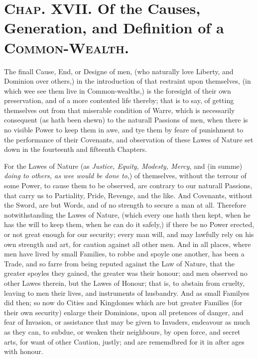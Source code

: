 
\section*{\textsc{Chap}. XVII. Of the Causes, Generation,
and Definition of a \textsc{Common-Wealth}.}

The finall Cause, End, or Designe of men, (who naturally love Liberty,
and Dominion over others,) in the introduction of that restraint upon
themselves, (in which wee see them live in Common-wealths,) is the
foresight of their own preservation, and of a more contented life
thereby; that is to say, of getting themselves out from that miserable
condition of Warre, which is necessarily consequent (as hath been
shewn) to the naturall Passions of men, when there is no visible Power
to keep them in awe, and tye them by feare of punishment to the
performance of their Covenants, and observation of these Lawes of
Nature set down in the fourteenth and fifteenth Chapters.

For the Lawes of Nature (as \textit{Justice, Equity, Modesty, Mercy},
and (in summe) \textit{doing to others, as wee would be done to},) of
themselves, without the terrour of some Power, to cause them to be
observed, are contrary to our naturall Passions, that carry us to
Partiality, Pride, Revenge, and the like. And Covenants, without the
Sword, are but Words, and of no strength to secure a man at all.
Therefore notwithstanding the Lawes of Nature, (which every one hath
then kept, when he has the will to keep them, when he can do it
safely,) if there be no Power erected, or not great enough for our
security; every man will, and may lawfully rely on his own strength
and art, for caution against all other men. And in all places,
 where men have lived by small Families, to robbe and spoyle
one another, has been a Trade, and so farre from being reputed against
the Law of Nature, that the greater spoyles they gained, the greater
was their honour; and men observed no other Lawes therein, but the
Lawes of Honour; that is, to abstain from cruelty, leaving to men
their lives, and instruments of husbandry. And as small Familyes did
then; so now do Cities and Kingdomes which are but greater Families
(for their own security) enlarge their Dominions, upon all pretences
of danger, and fear of Invasion, or assistance that may be given to
Invaders, endeavour as much as they can, to subdue, or weaken their
neighbours, by open force, and secret arts, for want of other Caution,
justly; and are rememdbred for it in after ages with honour.

